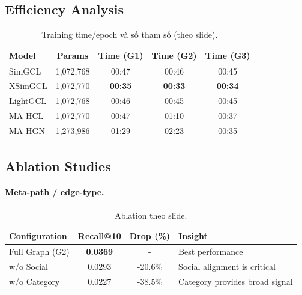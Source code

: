 \documentclass[11pt]{article}
\begin{document}
\subsection{Efficiency Analysis}
\begin{table}[t]
\centering
\small
\setlength{\tabcolsep}{4pt}
\renewcommand{\arraystretch}{1.06}
\begin{tabular}{l c c c c}
\toprule
\textbf{Model} & \textbf{Params} & \textbf{Time (G1)} & \textbf{Time (G2)} & \textbf{Time (G3)}\\
\midrule
SimGCL  & 1,072,768 & 00:47 & 00:46 & 00:45\\
XSimGCL & 1,072,770 & \textbf{00:35} & \textbf{00:33} & \textbf{00:34}\\
LightGCL& 1,072,768 & 00:46 & 00:45 & 00:45\\
\midrule
MA-HCL  & 1,072,770 & 00:47 & 01:10 & 00:37\\
MA-HGN  & 1,273,986 & 01:29 & 02:23 & 00:35\\
\bottomrule
\end{tabular}
\caption{Training time/epoch và số tham số (theo slide).}
\label{tab:efficiency}
\end{table}

\subsection{Ablation Studies}
\paragraph{Meta-path / edge-type.}
\begin{table}[t]
\centering
\small
\begin{tabular}{l c c l}
\toprule
\textbf{Configuration} & \textbf{Recall@10} & \textbf{Drop (\%)} & \textbf{Insight}\\
\midrule
Full Graph (G2) & \textbf{0.0369} & - & Best performance\\
w/o Social & 0.0293 & -20.6\% & Social alignment is critical\\
w/o Category & 0.0227 & -38.5\% & Category provides broad signal\\
\bottomrule
\end{tabular}
\caption{Ablation theo slide.}
\label{tab:ablation-metapath}
\end{table}
\end{document}
